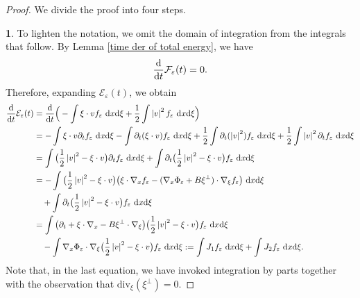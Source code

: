 \documentclass[11pt,reqno]{amsart}
\numberwithin{equation}{section}
\def\dd{{\rm d}}
\begin{document}
\begin{proof} We divide the proof into four steps.

\smallskip
\textbf{1}. To lighten the notation, we omit the domain of integration from the integrals that follow. By Lemma  \ref{time der of total energy}, 
we have 
$$
\frac{\dd}{\dd t}\mathcal{F}_{\varepsilon}(t)=0.
$$  
Therefore, expanding $\mathcal{E}_{\varepsilon}(t)$, we obtain
\begin{align*}
\frac{\dd}{\dd t}\mathcal{E}_{\varepsilon}(t)
&=\frac{\dd}{\dd t}\Big(-\int\xi\cdot v f_{\varepsilon}\ \dd x\dd \xi+\frac{1}{2}\int \left\vert v\right\vert^{2}f_{\varepsilon}\ \dd x\dd \xi \Big)\\
&= -\int\xi\cdot v\partial_{t}f_{\varepsilon}\ \dd x\dd \xi-\int \partial_{t}(\xi\cdot v)f_{\varepsilon}\ \dd x\dd \xi+\frac{1}{2}\int\partial_{t}(\left\vert v\right\vert^{2} )f_{\varepsilon}\ \dd x\dd \xi+\frac{1}{2}\int\left\vert v\right\vert^{2}\partial_{t}f_{\varepsilon}\ \dd x\dd \xi\\
&=\int \big(\frac{1}{2}\left\vert v\right\vert^{2}-\xi\cdot v\big)\partial_{t}f_{\varepsilon}\ \dd x\dd \xi
+\int\partial_{t}\big(\frac{1}{2}\left\vert v\right\vert^{2} -\xi\cdot v\big)f_{\varepsilon}\ \dd x\dd \xi\\
&=-\int \big(\frac{1}{2}\left\vert v\right\vert^{2}-\xi\cdot v \big)
\big(\xi\cdot \nabla_{x}f_{\varepsilon}-(\nabla_{x}\Phi_{\varepsilon}
+B\xi^{\perp})\cdot \nabla_{\xi}f_{\varepsilon}\big)\ \dd x\dd \xi\\
&\quad +\int\partial_{t}\big(\frac{1}{2}\left\vert v\right\vert^{2} -\xi\cdot v\big)f_{\varepsilon}\ \dd x\dd \xi\\
&=\int \big(\partial_{t}+\xi\cdot \nabla_{x}-B\xi^{\perp}\cdot \nabla_{\xi} \big)\big(\frac{1}{2}\left\vert v\right\vert^{2}-\xi\cdot v\big)f_{\varepsilon}\ \dd x\dd \xi\\
&\quad-\int \nabla_{x}\Phi_{\varepsilon}\cdot\nabla_{\xi}
\big(\frac{1}{2}\left\vert v\right\vert^{2}-\xi\cdot v \big)f_{\varepsilon}\ \dd x\dd \xi:= \int J_{1}f_{\varepsilon}\ \dd x\dd \xi+\int J_{2}f_{\varepsilon}\ \dd x\dd \xi. 
\end{align*}
Note that, in the last equation, we have invoked integration by parts 
together with the observation that $\mathrm{div}_{\xi}(\xi^{\perp})=0$.


\end{proof}
\end{document}

